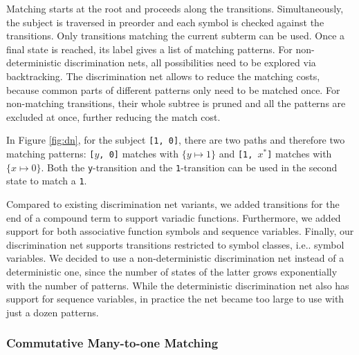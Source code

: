 \documentclass[conference,compsoc]{IEEEtran}
\makeatletter
\DeclareRobustCommand\onedot{\futurelet\@let@token\@onedot}
\def\@onedot{\ifx\@let@token.\else.\null\fi\xspace}
\def\ie{{i.e}\onedot} \def\Ie{{I.e}\onedot}
\newcommand{\regvar}[1]{#1}
\newcommand{\starvar}[1]{{#1}^*}
\makeatother
\begin{document}
Matching starts at the root and proceeds along the transitions.
Simultaneously, the subject is traversed in preorder and each symbol is checked against the transitions.
Only transitions matching the current subterm can be used.
Once a final state is reached, its label gives a list of matching patterns.
For non-deterministic discrimination nets, all possibilities need to be explored via backtracking.
The discrimination net allows to reduce the matching costs, because common parts of different patterns only need to be matched once.
For non-matching transitions, their whole subtree is pruned and all the patterns are excluded at once, further reducing the match cost.

In Figure \ref{fig:dn}, for the subject \texttt{{[}1, 0{]}}, there are two paths and therefore two matching patterns:
\texttt{{[}$\regvar{y}$, 0{]}} matches with $\{ y \mapsto 1 \}$ and \texttt{{[}1, $\starvar{x}${]}} matches with $\{ x \mapsto 0 \}$.
Both the \texttt{y}-transition and the \texttt{1}-transition can be used in the second state to match a \texttt{1}.

Compared to existing discrimination net variants, we added transitions for the end of a compound term to support variadic functions.
Furthermore, we added support for both associative function symbols and sequence variables.
Finally, our discrimination net supports transitions restricted to symbol classes, \ie symbol variables.
We decided to use a non-deterministic discrimination net instead of a deterministic one, since the number of states of the latter grows exponentially with the number of patterns.
While the deterministic discrimination net also has support for sequence variables, in practice the net became too large to use with just a dozen patterns.

\subsubsection{Commutative Many-to-one Matching%
\label{commutative-many-to-one-matching}%
}
\end{document}
